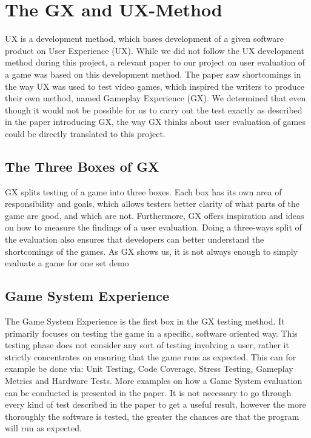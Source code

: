 \section{The GX and UX-Method}
\label{sec:gx_ux_method}
UX is a development method, which bases development of a given software product on User Experience (UX).
While we did not follow the UX development method during this project, a relevant paper to our project on user evaluation of a game was based on this development method.
The paper saw shortcomings in the way UX was used to test video games, which inspired the writers to produce their own method, named Gameplay Experience (GX).
We determined that even though it would not be possible for us to carry out the test exactly as described in the paper introducing GX, the way GX thinks about user evaluation of games could be directly translated to this project\cite{gxmethod}.

\subsection{The Three Boxes of GX}
GX splits testing of a game into three boxes.
Each box has its own area of responsibility and goals, which allows testers better clarity of what parts of the game are good, and which are not.
Furthermore, GX offers inspiration and ideas on how to measure the findings of a user evaluation.
Doing a three-ways split of the evaluation also ensures that developers can better understand the shortcomings of the games.
As GX shows us, it is not always enough to simply evaluate a game for one set demo

\subsection{Game System Experience}
The Game System Experience is the first box in the GX testing method.
It primarily focuses on testing the game in a specific, software oriented way.
This testing phase does not consider any sort of testing involving a user, rather it strictly concentrates on ensuring that the game runs as expected.
This can for example be done via: Unit Testing, Code Coverage, Stress Testing, Gameplay Metrics and Hardware Tests.
More examples on how a Game System evaluation can be conducted is presented in the paper\cite{gxmethod}.
It is not necessary to go through every kind of test described in the paper to get a useful result, however the more thoroughly the software is tested, the greater the chances are that the program will run as expected.


